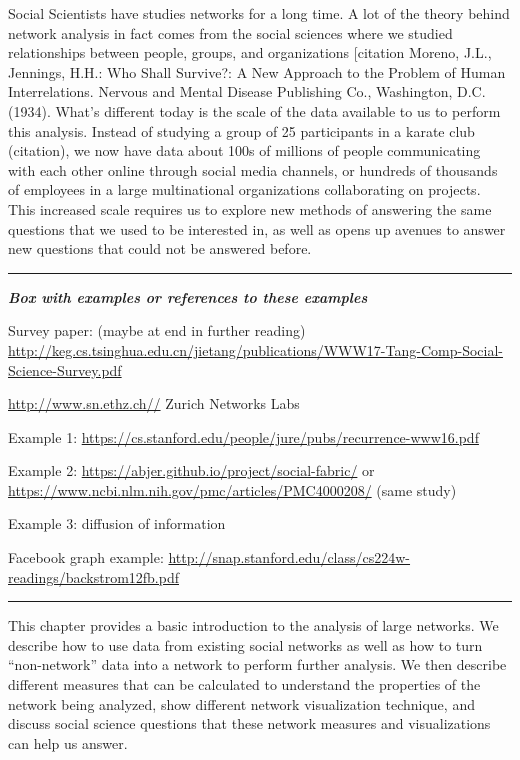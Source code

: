 \documentclass[]{krantz}
\begin{document}
Social Scientists have studies networks for a long time. A lot of the
theory behind network analysis in fact comes from the social sciences
where we studied relationships between people, groups, and organizations
{[}citation Moreno, J.L., Jennings, H.H.: Who Shall Survive?: A New
Approach to the Problem of Human Interrelations. Nervous and Mental
Disease Publishing Co., Washington, D.C. (1934). What's different today
is the scale of the data available to us to perform this analysis.
Instead of studying a group of 25 participants in a karate club
(citation), we now have data about 100s of millions of people
communicating with each other online through social media channels, or
hundreds of thousands of employees in a large multinational
organizations collaborating on projects. This increased scale requires
us to explore new methods of answering the same questions that we used
to be interested in, as well as opens up avenues to answer new questions
that could not be answered before.

\begin{center}\rule{0.5\linewidth}{\linethickness}\end{center}

\textbf{\emph{Box with examples or references to these examples}}

Survey paper: (maybe at end in further reading)
\url{http://keg.cs.tsinghua.edu.cn/jietang/publications/WWW17-Tang-Comp-Social-Science-Survey.pdf}

\url{http://www.sn.ethz.ch//} Zurich Networks Labs

Example 1:
\url{https://cs.stanford.edu/people/jure/pubs/recurrence-www16.pdf}

Example 2: \url{https://abjer.github.io/project/social-fabric/} or
\url{https://www.ncbi.nlm.nih.gov/pmc/articles/PMC4000208/} (same study)

Example 3: diffusion of information

Facebook graph example:
\url{http://snap.stanford.edu/class/cs224w-readings/backstrom12fb.pdf}

\begin{center}\rule{0.5\linewidth}{\linethickness}\end{center}

This chapter provides a basic introduction to the analysis of large
networks. We describe how to use data from existing social networks as
well as how to turn ``non-network'' data into a network to perform
further analysis. We then describe different measures that can be
calculated to understand the properties of the network being analyzed,
show different network visualization technique, and discuss social
science questions that these network measures and visualizations can
help us answer.
\end{document}

